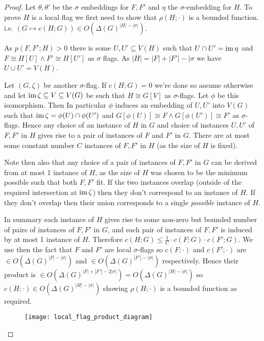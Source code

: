 \begin{proof}
    Let $\theta,\theta'$ be the $\sigma$ embeddings for $F, F'$ and $\eta$ the
    $\sigma$-embedding for $H.$
    To prove $H$ is a local flag we first need to show that $\rho(H; \cdot)$ is a bounded function.
    i.e. $(G \mapsto c(H; G)) \in O(\Delta(G)^{|H|-|\sigma|}).$

    As $p(F, F'; H) > 0$ there is some $U, U'\subseteq V(H)$ such that $U\cap U'=\operatorname{im}\eta$ and
    $F \cong H[U] \land F'\cong H[U']$ as $\sigma$ flags. As $|H|=|F|+|F'|-|\sigma$ we
    have $U \cup U' = V(H)$.

    Let $(G, \zeta)$ be another $\sigma$-flag. If $c(H; G) = 0$ we're done so assume otherwise and
    let $\operatorname{im}\zeta \subseteq V\subseteq V(G)$ be such that $H \cong G[V]$ as $\sigma$-flags. Let
    $\phi$ be this isomorphism. Then In particular $\phi$ induces an embedding of $U, U'$ into
    $V(G)$ such that $\operatorname{im}\zeta = \phi(U) \cap \phi(U')$ and $G[\phi(U)] \cong F\land G[\phi(U')]
    \cong F'$ as $\sigma$-flags.  Hence any choice of an instance of $H$ in $G$ and choice of
    instances $U, U'$ of $F, F'$ in $H$ gives rise to a pair of instances of $F$ and $F'$ in $G.$
    There are at most some constant number $C$ instances of $F, F'$ in $H$ (as the size of $H$ is
    fixed).

    Note then also that any choice of a pair of instances of $F, F'$ in $G$ can be derived from at
    most 1 instance of $H$, as the size of $H$ was chosen to be the minimum possible such that both
    $F,F'$ fit. If the two instances overlap (outside of the required intersection at $\operatorname{im}\zeta$)
    then they don't correspond to an instance of $H.$ If they don't overlap then their
    union corresponds to a single \textit{possible} instance of $H$.

    In summary each instance of $H$ gives rise to some non-zero but bounded number of pairs of
    instances of $F, F'$ in $G$, and each pair of instances of $F, F'$ is induced by at most
    1 instance of $H.$
    Therefore $c(H; G) \leq \frac{1}{C}\cdot c(F; G)\cdot c(F'; G)$. We use then
    the fact that $F$ and $F'$ are local $\sigma$-flags so $c(F; \cdot)$ and
    $c(F'; \cdot)$ are $\in O(\Delta(G)^{|F|-|\sigma|})$ and $\in O(\Delta(G)^{|F'|-|\sigma|})$
    respectively. Hence their product is
    $\in O(\Delta(G)^{|F|+|F'|-2|\sigma|}) = O(\Delta(G)^{|H|-|\sigma|})$ so
    $c(H; \cdot) \in O(\Delta(G)^{|H|-|\sigma|})$ showing $\rho(H; \cdot)$ is a bounded function as
    required.

    \begin{figure}[!ht]
        \centering
        \texttt{[image: local\_flag\_product\_diagram]}
    \end{figure}


\end{proof}
